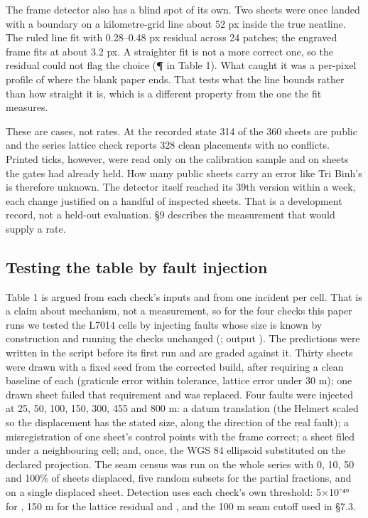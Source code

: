 \documentclass[11pt,a4paper]{article}
\begin{document}
The frame detector also has a blind spot of its own. Two sheets were once landed with a boundary on a kilometre-grid line about 52 px inside the true neatline. The ruled line fit with 0.28–0.48 px residual across 24 patches; the engraved frame fits at about 3.2 px. A straighter fit is not a more correct one, so the residual could not flag the choice (\textbf{¶} in Table 1). What caught it was a per-pixel profile of where the blank paper ends. That tests what the line bounds rather than how straight it is, which is a different property from the one the fit measures.

These are cases, not rates. At the recorded state 314 of the 360 sheets are public and the series lattice check reports 328 clean placements with no conflicts. Printed ticks, however, were read only on the calibration sample and on sheets the gates had already held. How many public sheets carry an error like Tri Binh's is therefore unknown. The detector itself reached its 39th version within a week, each change justified on a handful of inspected sheets. That is a development record, not a held-out evaluation. §9 describes the measurement that would supply a rate.

\subsection{Testing the table by fault injection}

Table 1 is argued from each check's inputs and from one incident per cell. That is a claim about mechanism, not a measurement, so for the four checks this paper runs we tested the L7014 cells by injecting faults whose size is known by construction and running the checks unchanged (\texttt{}; output \texttt{}). The predictions were written in the script before its first run and are graded against it. Thirty sheets were drawn with a fixed seed from the corrected build, after requiring a clean baseline of each (graticule error within tolerance, lattice error under 30 m); one drawn sheet failed that requirement and was replaced. Four faults were injected at 25, 50, 100, 150, 300, 455 and 800 m: a datum translation (the Helmert scaled so the displacement has the stated size, along the direction of the real fault); a misregistration of one sheet's control points with the frame correct; a sheet filed under a neighbouring cell; and, once, the WGS 84 ellipsoid substituted on the declared projection. The seam census was run on the whole series with 0, 10, 50 and 100\% of sheets displaced, five random subsets for the partial fractions, and on a single displaced sheet. Detection uses each check's own threshold: 5×10⁻⁴° for \texttt{}, 150 m for the lattice residual and \texttt{}, and the 100 m seam cutoff used in §7.3.
\end{document}
